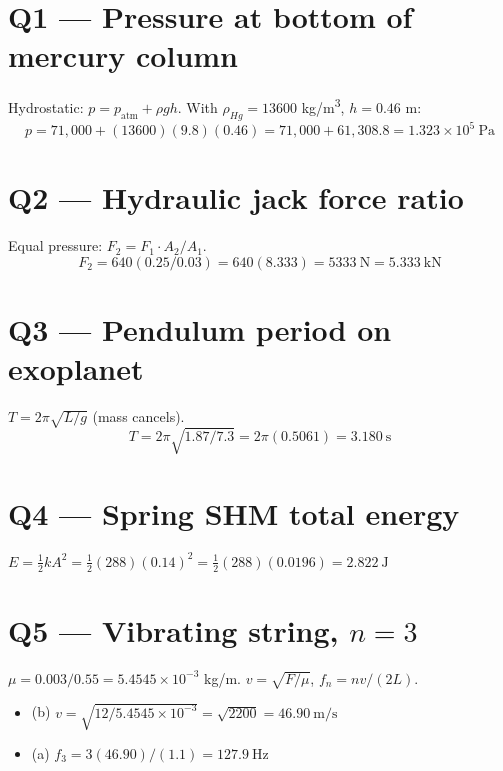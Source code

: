 \documentclass[11pt]{article}
\begin{document}
\section*{Q1 --- Pressure at bottom of mercury column}
Hydrostatic: $p = p_{\text{atm}} + \rho g h$. With $\rho_{Hg}=13600$ kg/m\textsuperscript{3}, $h=0.46$ m:
\[ p = 71{,}000 + (13600)(9.8)(0.46) = 71{,}000 + 61{,}308.8 = \boxed{1.323\times 10^5\ \text{Pa}} \]

\section*{Q2 --- Hydraulic jack force ratio}
Equal pressure: $F_2 = F_1\cdot A_2/A_1$.
\[ F_2 = 640(0.25/0.03) = 640(8.333) = 5333\ \text{N} = \boxed{5.333\ \text{kN}} \]

\section*{Q3 --- Pendulum period on exoplanet}
$T = 2\pi\sqrt{L/g}$ (mass cancels).
\[ T = 2\pi\sqrt{1.87/7.3} = 2\pi(0.5061) = \boxed{3.180\ \text{s}} \]

\section*{Q4 --- Spring SHM total energy}
$E = \tfrac12 kA^2 = \tfrac12(288)(0.14)^2 = \tfrac12(288)(0.0196) = \boxed{2.822\ \text{J}}$

\section*{Q5 --- Vibrating string, $n=3$}
$\mu = 0.003/0.55 = 5.4545\times 10^{-3}$ kg/m. $v=\sqrt{F/\mu}$, $f_n=nv/(2L)$.
\begin{itemize}[leftmargin=*]
  \item (b) $v = \sqrt{12/5.4545\times 10^{-3}} = \sqrt{2200} = \boxed{46.90\ \text{m/s}}$
  \item (a) $f_3 = 3(46.90)/(1.1) = \boxed{127.9\ \text{Hz}}$
\end{itemize}
\end{document}
